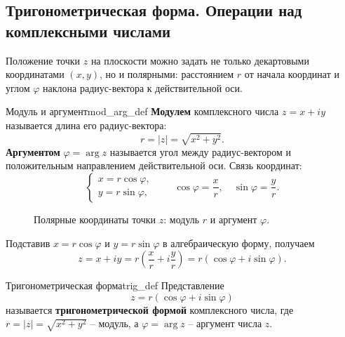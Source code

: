\documentclass[12pt,a4paper]{article}
\begin{document}
\subsection*{Тригонометрическая форма. Операции над комплексными числами}

Положение точки $z$ на плоскости можно задать не только декартовыми
координатами $(x, y)$, но и полярными: расстоянием $r$ от начала
координат и углом $\varphi$ наклона радиус-вектора к действительной оси.

\begin{definition}{Модуль и аргумент}{mod_arg_def}
  \textbf{Модулем} комплексного числа $z = x + iy$ называется длина его
  радиус-вектора:
  \[
    r = |z| = \sqrt{x^2 + y^2}.
  \]
  \textbf{Аргументом} $\varphi = \arg z$ называется угол между
  радиус-вектором и положительным направлением действительной оси.
  Связь координат:
  \[
    \begin{cases} x = r\cos\varphi, \\ y = r\sin\varphi,
    \end{cases}
    \qquad
    \cos\varphi = \frac{x}{r}, \quad \sin\varphi = \frac{y}{r}.
  \]
\end{definition}

\begin{figure}[h!]
  \centering
  \caption{Полярные координаты точки $z$: модуль $r$ и аргумент $\varphi$.}
  \label{fig:trig_form}
\end{figure}

Подставив $x = r\cos\varphi$ и $y = r\sin\varphi$ в алгебраическую
форму, получаем
\[
  z = x + iy = r\!\left(\frac{x}{r} + i\frac{y}{r}\right)
  = r(\cos\varphi + i\sin\varphi).
\]

\begin{definition}{Тригонометрическая форма}{trig_def}
  Представление
  \[
    z = r(\cos\varphi + i\sin\varphi)
  \]
  называется \textbf{тригонометрической формой} комплексного числа,
  где $r = |z| = \sqrt{x^2 + y^2}$ -- модуль, а $\varphi = \arg z$ --
  аргумент числа $z$.
\end{definition}
\end{document}

